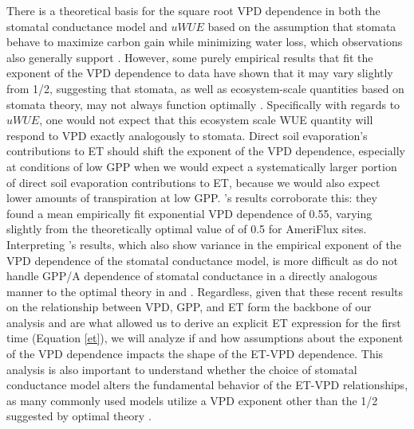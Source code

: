 \documentclass[draft,linenumbers]{afmjournal}
\begin{document}
There is a theoretical basis for the square root VPD dependence in
both the stomatal conductance model and $uWUE$ based on the assumption
that stomata behave to maximize carbon gain while minimizing water
loss, which observations also generally support \citep{Lloyd_1991,
  MEDLYN_2011, Lin_2015, Zhou_2014, Zhou_2015, Medlyn_2017}. However,
some purely empirical results that fit the exponent of the VPD
dependence to data have shown that it may vary slightly from 1/2,
suggesting that stomata, as well as ecosystem-scale quantities based
on stomata theory, may not always function optimally \citep{Zhou_2015,
  Lin_2018}. Specifically with regards to $uWUE$, one would not expect
that this ecosystem scale WUE quantity will respond to VPD exactly
analogously to stomata. Direct soil evaporation's contributions to ET
should shift the exponent of the VPD dependence, especially at
conditions of low GPP when we would expect a systematically larger
portion of direct soil evaporation contributions to ET, because we
would also expect lower amounts of transpiration at low GPP. \citet{Zhou_2015}'s
results corroborate this: they found a mean empirically fit
exponential VPD dependence of 0.55, varying slightly from the
theoretically optimal value of of 0.5 for AmeriFlux
sites. Interpreting \citet{Lin_2018}'s results, which also show
variance in the empirical exponent of the VPD dependence of the
stomatal conductance model, is more difficult as \citet{Lin_2018} do
not handle GPP/A dependence of stomatal conductance in a directly
analogous manner to the optimal theory in \citet{MEDLYN_2011} and
\citet{Medlyn_2017}. Regardless, given that these recent results on
the relationship between VPD, GPP, and ET \citep{MEDLYN_2011,
  Zhou_2014, Zhou_2015, Medlyn_2017} form the backbone of our analysis
and are what allowed us to derive an explicit ET expression for the
first time (Equation \ref{et}), we will analyze if and how assumptions
about the exponent of the VPD dependence impacts the shape of the
ET-VPD dependence. This analysis is also important to understand whether the choice of stomatal conductance model alters the fundamental behavior of the ET-VPD relationships, as many commonly used models  utilize a VPD exponent other than the 1/2 suggested by optimal theory \citep[e.g. ][ which uses an exponent of 1]{Leuning_1990}.
\end{document}
